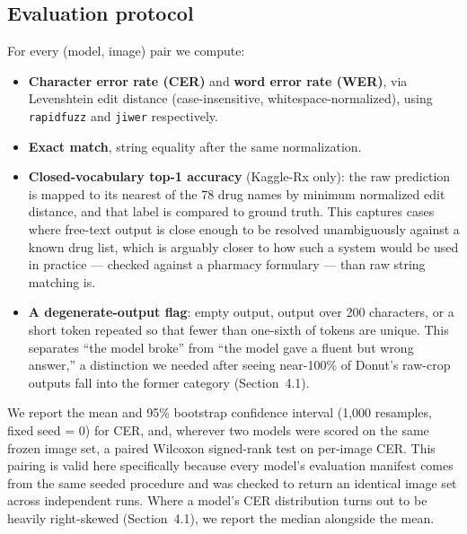 \documentclass[12pt]{article}
\begin{document}
\subsection{Evaluation protocol}

For every (model, image) pair we compute:

\begin{itemize}[leftmargin=*]
\item \textbf{Character error rate (CER)} and \textbf{word error rate (WER)}, via Levenshtein edit distance
(case-insensitive, whitespace-normalized), using \texttt{rapidfuzz} and \texttt{jiwer} respectively.
\item \textbf{Exact match}, string equality after the same normalization.
\item \textbf{Closed-vocabulary top-1 accuracy} (Kaggle-Rx only): the raw prediction is mapped to its
nearest of the 78 drug names by minimum normalized edit distance, and that label is compared to ground
truth. This captures cases where free-text output is close enough to be resolved unambiguously against a
known drug list, which is arguably closer to how such a system would be used in practice --- checked against
a pharmacy formulary --- than raw string matching is.
\item \textbf{A degenerate-output flag}: empty output, output over 200 characters, or a short token repeated
so that fewer than one-sixth of tokens are unique. This separates ``the model broke'' from ``the model gave
a fluent but wrong answer,'' a distinction we needed after seeing near-100\% of Donut's raw-crop outputs
fall into the former category (Section~4.1).
\end{itemize}

We report the mean and 95\% bootstrap confidence interval (1{,}000 resamples, fixed seed = 0) for CER, and,
wherever two models were scored on the same frozen image set, a paired Wilcoxon signed-rank test on
per-image CER. This pairing is valid here specifically because every model's evaluation manifest comes from
the same seeded procedure and was checked to return an identical image set across independent runs. Where a
model's CER distribution turns out to be heavily right-skewed (Section~4.1), we report the median alongside
the mean.
\end{document}

